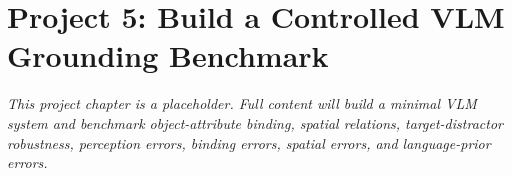 \chapter*{Project 5: Build a Controlled VLM Grounding Benchmark}
\label{project:vlm-grounding-benchmark}


\textit{This project chapter is a placeholder. Full content will build a minimal VLM system and benchmark object-attribute binding, spatial relations, target-distractor robustness, perception errors, binding errors, spatial errors, and language-prior errors.}
